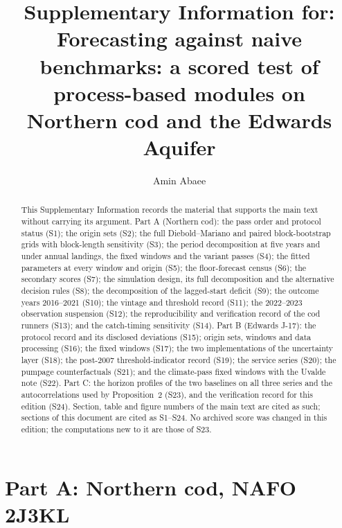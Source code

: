 \documentclass[preprint,11pt,authoryear]{elsarticle}
\theoremstyle{remark}
\begin{document}
\begin{frontmatter}
\title{Supplementary Information for:\\ Forecasting against naive benchmarks: a scored test of process-based modules on Northern cod and the Edwards Aquifer}
\author[1]{Amin Abaee}
\begin{abstract}
This Supplementary Information records the material that supports the main text without carrying its argument. Part A (Northern cod): the pass order and protocol status (S1); the origin sets (S2); the full Diebold--Mariano and paired block-bootstrap grids with block-length sensitivity (S3); the period decomposition at five years and under annual landings, the fixed windows and the variant passes (S4); the fitted parameters at every window and origin (S5); the floor-forecast census (S6); the secondary scores (S7); the simulation design, its full decomposition and the alternative decision rules (S8); the decomposition of the lagged-start deficit (S9); the outcome years 2016--2021 (S10); the vintage and threshold record (S11); the 2022--2023 observation suspension (S12); the reproducibility and verification record of the cod runners (S13); and the catch-timing sensitivity (S14). Part B (Edwards J-17): the protocol record and its disclosed deviations (S15); origin sets, windows and data processing (S16); the fixed windows (S17); the two implementations of the uncertainty layer (S18); the post-2007 threshold-indicator record (S19); the service series (S20); the pumpage counterfactuals (S21); and the climate-pass fixed windows with the Uvalde note (S22). Part C: the horizon profiles of the two baselines on all three series and the autocorrelations used by Proposition~2 (S23), and the verification record for this edition (S24). Section, table and figure numbers of the main text are cited as such; sections of this document are cited as S1--S24. No archived score was changed in this edition; the computations new to it are those of S23.
\end{abstract}
\end{frontmatter}

\part*{Part A: Northern cod, NAFO 2J3KL}
\end{document}
